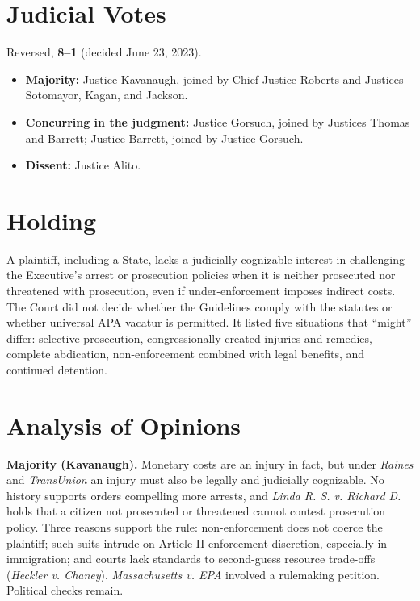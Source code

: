 \documentclass[12pt]{article}
\begin{document}
\section{Judicial Votes}

Reversed, \textbf{8--1} (decided June 23, 2023).
\begin{itemize}
\item \textbf{Majority:} Justice Kavanaugh, joined by Chief Justice Roberts and Justices Sotomayor, Kagan, and Jackson.
\item \textbf{Concurring in the judgment:} Justice Gorsuch, joined by Justices Thomas and Barrett; Justice Barrett, joined by Justice Gorsuch.
\item \textbf{Dissent:} Justice Alito.
\end{itemize}

\section{Holding}

A plaintiff, including a State, lacks a judicially cognizable interest in challenging the Executive's arrest or prosecution policies when it is neither prosecuted nor threatened with prosecution, even if under-enforcement imposes indirect costs. The Court did not decide whether the Guidelines comply with the statutes or whether universal APA vacatur is permitted. It listed five situations that ``might'' differ: selective prosecution, congressionally created injuries and remedies, complete abdication, non-enforcement combined with legal benefits, and continued detention.

\section{Analysis of Opinions}

\textbf{Majority (Kavanaugh).} Monetary costs are an injury in fact, but under \textit{Raines} and \textit{TransUnion} an injury must also be legally and judicially cognizable. No history supports orders compelling more arrests, and \textit{Linda R. S. v. Richard D.} holds that a citizen not prosecuted or threatened cannot contest prosecution policy. Three reasons support the rule: non-enforcement does not coerce the plaintiff; such suits intrude on Article II enforcement discretion, especially in immigration; and courts lack standards to second-guess resource trade-offs (\textit{Heckler v. Chaney}). \textit{Massachusetts v. EPA} involved a rulemaking petition. Political checks remain.
\end{document}
